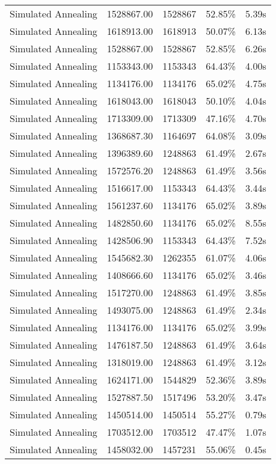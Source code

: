 \begin{table}[ht]
\begin{tabular}{|r|r|r|r|r|}
Simulated Annealing & 1528867.00 & 1528867 & 52.85\% & 5.39s\\
Simulated Annealing & 1618913.00 & 1618913 & 50.07\% & 6.13s\\
Simulated Annealing & 1528867.00 & 1528867 & 52.85\% & 6.26s\\
Simulated Annealing & 1153343.00 & 1153343 & 64.43\% & 4.00s\\
Simulated Annealing & 1134176.00 & 1134176 & 65.02\% & 4.75s\\
Simulated Annealing & 1618043.00 & 1618043 & 50.10\% & 4.04s\\
Simulated Annealing & 1713309.00 & 1713309 & 47.16\% & 4.70s\\
Simulated Annealing & 1368687.30 & 1164697 & 64.08\% & 3.09s\\
Simulated Annealing & 1396389.60 & 1248863 & 61.49\% & 2.67s\\
Simulated Annealing & 1572576.20 & 1248863 & 61.49\% & 3.56s\\
Simulated Annealing & 1516617.00 & 1153343 & 64.43\% & 3.44s\\
Simulated Annealing & 1561237.60 & 1134176 & 65.02\% & 3.89s\\
Simulated Annealing & 1482850.60 & 1134176 & 65.02\% & 8.55s\\
Simulated Annealing & 1428506.90 & 1153343 & 64.43\% & 7.52s\\
Simulated Annealing & 1545682.30 & 1262355 & 61.07\% & 4.06s\\
Simulated Annealing & 1408666.60 & 1134176 & 65.02\% & 3.46s\\
Simulated Annealing & 1517270.00 & 1248863 & 61.49\% & 3.85s\\
Simulated Annealing & 1493075.00 & 1248863 & 61.49\% & 2.34s\\
Simulated Annealing & 1134176.00 & 1134176 & 65.02\% & 3.99s\\
Simulated Annealing & 1476187.50 & 1248863 & 61.49\% & 3.64s\\
Simulated Annealing & 1318019.00 & 1248863 & 61.49\% & 3.12s\\
Simulated Annealing & 1624171.00 & 1544829 & 52.36\% & 3.89s\\
Simulated Annealing & 1527887.50 & 1517496 & 53.20\% & 3.47s\\
Simulated Annealing & 1450514.00 & 1450514 & 55.27\% & 0.79s\\
Simulated Annealing & 1703512.00 & 1703512 & 47.47\% & 1.07s\\
Simulated Annealing & 1458032.00 & 1457231 & 55.06\% & 0.45s\\

\end{tabular}
\end{table}
